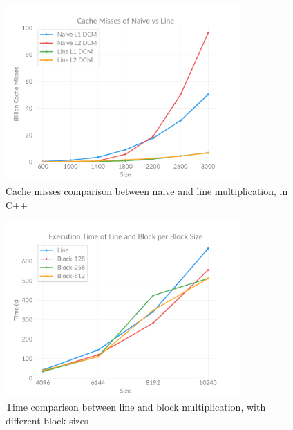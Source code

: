     \begin{figure}[ht]
        \centering
        \captionsetup{justification=centering, margin=2cm}
        \includegraphics[width=0.8\textwidth]{pdf/naive-line-cache}
        \caption{Cache misses comparison between naive and line multiplication, in C++}
        \label{fig:chart:naive-line-cache}
    \end{figure}

    \begin{figure}[ht]
        \centering
        \captionsetup{justification=centering, margin=2cm}
        \includegraphics[width=0.8\textwidth]{pdf/line-block-time}
        \caption{Time comparison between line and block multiplication, with different block sizes}
        \label{fig:chart:line-block-time}
    \end{figure}

